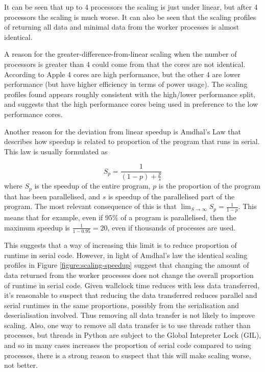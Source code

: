 \documentclass[logo,msc,dsti]{infthesis}    %
\begin{document}
{It can be seen that up to 4 processors the scaling is just under linear, but after 4 processors the scaling is much worse. It can also be seen that the scaling profiles of returning all data and minimal data from the worker processes is almost identical.

A reason for the greater-difference-from-linear scaling when the number of processors is greater than 4 could come from that the cores are not identical. According to Apple \cite{AppleM1Overview} 4 cores are high performance, but the other 4 are lower performance (but have higher efficiency in terms of power usage). The scaling profiles found appears roughly consistent with the high/lower performance split, and suggests that the high performance cores being used in preference to the low performance cores.

Another reason for the deviation from linear speedup is Amdhal's Law that describes how speedup is related to proportion of the program that runs in serial. This law is usually formulated as

\begin{equation}
S_p = \frac{1}{(1-p) + \frac{p}{s}}
\end{equation}
%
where $S_p$ is the speedup of the entire program, $p$ is the proportion of the program that has been parallelised, and $s$ is speedup of the parallelised part of the program. The most relevant consequence of this is that $\lim_{S\to\infty} S_p = \frac{1}{1-p}$. This means that for example, even if 95\% of a program is parallelised, then the maximum speedup is $\frac{1}{1-0.95}=20$, even if thousands of processes are used.

This suggests that a way of increasing this limit is to reduce proportion of runtime in serial code. However, in light of Amdhal's law the identical scaling profiles in Figure \ref{figure:scaling-speedup} suggest that changing the amount of data returned from the worker processes does not change the overall proportion of runtime in serial code. Given wallclock time reduces with less data transferred, it's reasonable to suspect that reducing the data transferred reduces parallel and serial runtimes in the same proportions, possibly from the serialisation and deserialisation involved. Thus removing all data transfer is not likely to improve scaling. Also, one way to remove all data transfer is to use threads rather than processes, but threads in Python are subject to the Global Intepreter Lock (GIL), and so in many cases increases the proportion of serial code compared to using processes, there is a strong reason to suspect that this will make scaling worse, not better.

}
\end{document}
